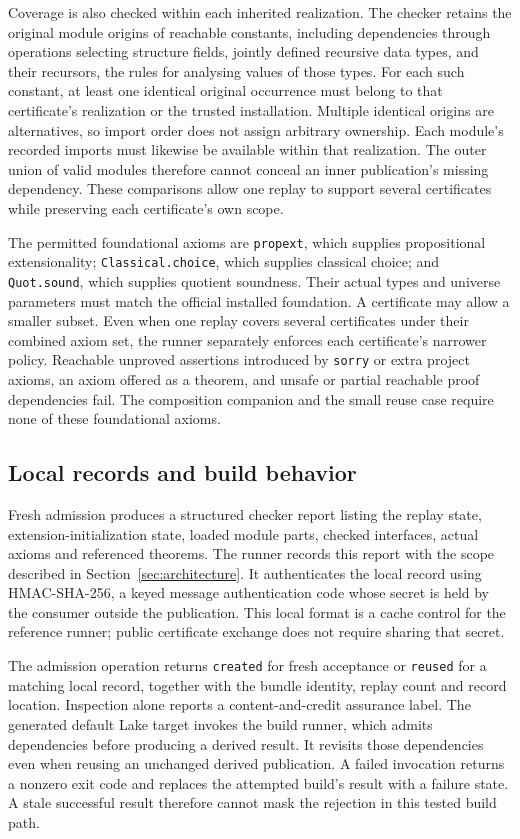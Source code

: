 \documentclass[11pt]{article}
\begin{document}
Coverage is also checked within each inherited realization. The checker retains
the original module origins of reachable constants, including dependencies
through operations selecting structure fields, jointly defined recursive data
types, and their recursors, the rules for analysing values of those types. For each
such constant, at least one identical original occurrence must belong to that
certificate's realization or the trusted installation. Multiple identical
origins are alternatives, so import order does not assign arbitrary ownership.
Each module's recorded imports must likewise be available within that
realization. The outer union of valid modules therefore cannot conceal an
inner publication's missing dependency. These comparisons allow one replay to
support several certificates while preserving each certificate's own scope.

The permitted foundational axioms are \texttt{propext}, which supplies
propositional extensionality; \texttt{Classical.choice}, which supplies classical
choice; and \texttt{Quot.sound}, which supplies quotient soundness. Their actual
types and universe parameters must match the official installed foundation.
A certificate may allow a smaller subset. Even when one replay covers several
certificates under their combined axiom set, the runner separately enforces
each certificate's narrower policy. Reachable unproved assertions introduced by \texttt{sorry} or extra
project axioms, an axiom offered as a theorem, and unsafe or partial reachable
proof dependencies fail. The composition companion and the small reuse case
require none of these foundational axioms.

\subsection{Local records and build behavior}

Fresh admission produces a structured checker report listing the replay state,
extension-initialization state, loaded module parts, checked interfaces,
actual axioms and referenced theorems. The runner records this report with the
scope described in Section~\ref{sec:architecture}. It authenticates the local
record using HMAC-SHA-256, a keyed message authentication code whose secret is
held by the consumer outside the publication. This local format is a cache
control for the reference runner; public certificate exchange does not require
sharing that secret.

The admission operation returns \texttt{created} for fresh acceptance or
\texttt{reused} for a matching local record, together with the bundle identity,
replay count and record location. Inspection alone reports a content-and-credit
assurance label. The generated default Lake target invokes the build runner,
which admits dependencies before producing a derived result. It revisits those
dependencies even when reusing an unchanged derived publication. A failed
invocation returns a nonzero exit code and replaces the attempted build's
result with a failure state. A stale successful result therefore cannot mask
the rejection in this tested build path.
\end{document}
